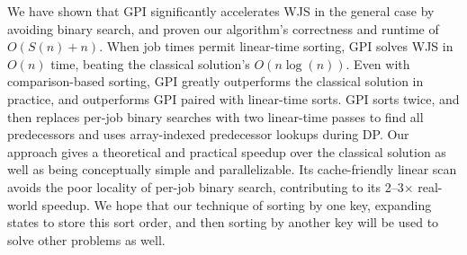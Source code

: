 \documentclass[final,5p,times]{elsarticle}
\begin{document}
We have shown that GPI significantly accelerates WJS in the general case by avoiding binary search, and proven our algorithm's correctness and runtime of $O(S(n) + n)$. When job times permit linear-time sorting, GPI solves WJS in $O(n)$ time, beating the classical solution's $O(n \log(n))$. Even with comparison-based sorting, GPI greatly outperforms the classical solution in practice, and outperforms GPI paired with linear-time sorts. GPI sorts twice, and then replaces per-job binary searches with two linear-time passes to find all predecessors and uses array-indexed predecessor lookups during DP. Our approach gives a theoretical and practical speedup over the classical solution as well as being conceptually simple and parallelizable. Its cache-friendly linear scan avoids the poor locality of per-job binary search, contributing to its 2–3× real-world speedup. We hope that our technique of sorting by one key, expanding states to store this sort order, and then sorting by another key will be used to solve other problems as well.


\end{document}
